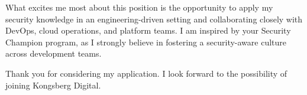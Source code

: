 What excites me most about this position is the opportunity to apply my security knowledge in an engineering-driven setting and collaborating closely with DevOps, cloud operations, and platform teams. I am inspired by your Security Champion program, as I strongly believe in fostering a security-aware culture across development teams. 


Thank you for considering my application. I look forward to the possibility of joining Kongsberg Digital.